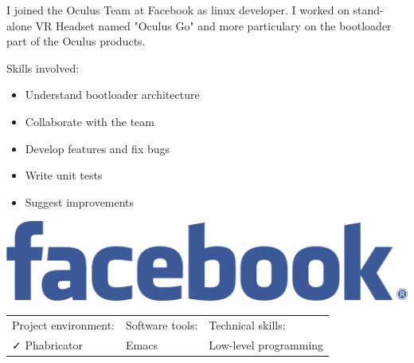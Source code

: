 \documentclass[letterpaper]{jm-cv} %
\begin{document}
\medskip
{}

\medskip
{}
\medskip

\small{


  I joined the Oculus Team at Facebook as linux developer.
  I worked on stand-alone VR Headset named "Oculus Go" and more particulary on the bootloader part of the Oculus products.

  \vspace{0.2cm}
  \begin{minipage}{.7\textwidth}
    {\footnotesize\color{maingray}\bullet} Skills involved:
    \begin{itemize}
    \item[\color{mainblue}\faArrowRight] Understand bootloader architecture
    \item[\color{mainblue}\faArrowRight] Collaborate with the team
    \item[\color{mainblue}\faArrowRight] Develop features and fix bugs
    \item[\color{mainblue}\faArrowRight] Write unit tests
    \item[\color{mainblue}\faArrowRight] Suggest improvements
    \end{itemize}
  \end{minipage}%
  \begin{minipage}{.3\textwidth}
    \center
    \includegraphics[scale=0.06]{logo-facebook.png}
  \end{minipage}
  \vspace{0.2cm}

  \begin{tabular}{ l l l }
    Project environment: & \hspace{1cm}Software tools: & \hspace{1cm}Technical skills:\\
    {\color{mainblue}\faCheck} Phabricator &
    \hspace{1cm}{\color{maingreen}\faCheck} Emacs &
    \hspace{1cm}{\color{maingray}\faCheck} Low-level programming\\


\end{tabular}}
\end{document}
